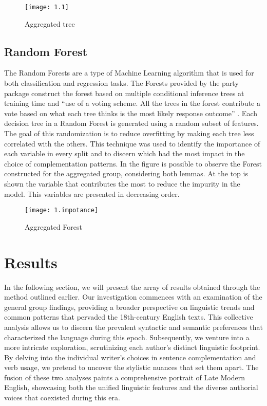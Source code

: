 \documentclass[final]{clv3} %
\begin{document}
\begin{figure}[htpb]
    \centering
    \texttt{[image: 1.1]}
    \caption{Aggregated tree}
    \label{fig:1}
\end{figure}

\subsection{Random Forest}
The Random Forests are a type of Machine Learning algorithm that is used for both classification and regression tasks. The Forests provided by the party package construct the forest based on multiple conditional inference trees at training time and “use of a voting scheme. All the trees in the forest contribute a vote based on what each tree thinks is the most likely response outcome” \citep{tagliamonte2012models}\citeyearpar{tagliamonte2012models} . Each decision tree in a Random Forest is generated using a random subset of features. The goal of this randomization is to reduce overfitting by making each tree less correlated with the others. This technique was used to identify the importance of each variable in every split and to discern which had the most impact in the choice of complementation
patterns.
In the figure is possible to observe the Forest constructed for the aggregated group, considering both lemmas. At the top is shown the variable that contributes the most to reduce the impurity in the model. This variables are presented in decreasing order.

\begin{figure}[htpb]
    \centering
    \texttt{[image: 1.impotance]}
    \caption{Aggregated Forest}
    \label{fig:11}
\end{figure}

\section{Results}
In the following section, we will present the array of results obtained through the method outlined earlier. Our investigation commences with an examination of the general group findings, providing a broader perspective on linguistic trends and common patterns that pervaded the 18th-century English texts. This collective analysis allows us to discern the prevalent syntactic and semantic preferences that characterized the language during this epoch. 
Subsequently, we venture into a more intricate exploration, scrutinizing each author’s distinct linguistic footprint. By delving into the individual writer’s choices in sentence complementation and verb usage, we pretend to uncover the stylistic nuances that set them apart. The fusion of these two analyses paints a comprehensive portrait of Late Modern English, showcasing both the unified linguistic features and the diverse authorial voices that coexisted during this era.
\end{document}
